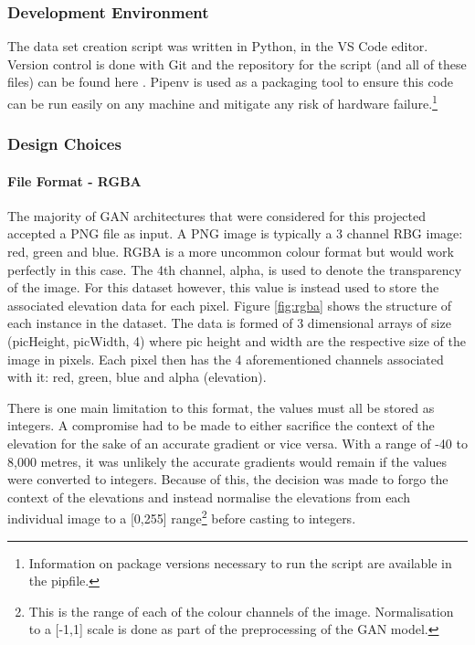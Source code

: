 \documentclass[a4paper]{report}
\begin{document}
\subsubsection{Development Environment}
The data set creation script was written in Python, in the VS Code editor. Version control is done with Git and the repository for the script (and all of these files) can be found here \cite{ToDo}. Pipenv \cite{ToDo} is used as a packaging tool to ensure this code can be run easily on any machine and mitigate any risk of hardware failure.\footnote{Information on package versions necessary to run the script are available in the pipfile.}

\subsubsection{Design Choices}
\paragraph{File Format - RGBA}
The majority of GAN architectures that were considered for this projected accepted a PNG file as input. A PNG image is typically a 3 channel RBG image: red, green and blue. RGBA is a more uncommon colour format but would work perfectly in this case. The 4th channel, alpha, is used to denote the transparency of the image. For this dataset however, this value is instead used to store the associated elevation data for each pixel. Figure \ref{fig:rgba} shows the structure of each instance in the dataset. The data is formed of 3 dimensional arrays of size (picHeight, picWidth, 4) where pic height and width are the respective size of the image in pixels. Each pixel then has the 4 aforementioned channels associated with it: red, green, blue and alpha (elevation).

There is one main limitation to this format, the values must all be stored as integers. A compromise had to be made to either sacrifice the context of the elevation for the sake of an accurate gradient or vice versa. With a range of -40 to 8,000 metres, it was unlikely the accurate gradients would remain if the values were converted to integers. Because of this, the decision was made to forgo the context of the elevations and instead normalise the elevations from each individual image to a [0,255] range\footnote{This is the range of each of the colour channels of the image. Normalisation to a [-1,1] scale is done as part of the preprocessing of the GAN model.} before casting to integers.
\end{document}
